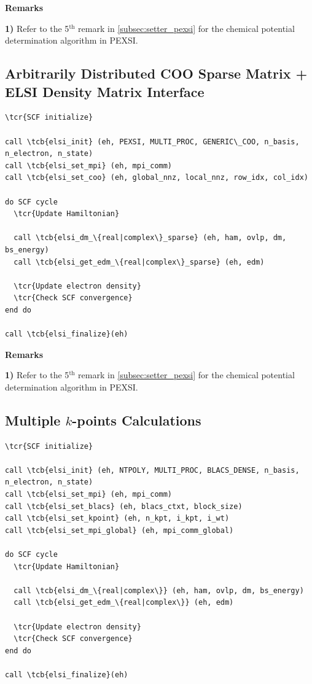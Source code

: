 \documentclass{report}
\newcommand{\tcb}[1]{\textcolor{blue}{#1}}
\newcommand{\tcr}[1]{\textcolor{red}{#1}}
\begin{document}
\textbf{Remarks}

\textbf{1)} Refer to the 5$^\text{th}$ remark in \ref{subsec:setter_pexsi} for the chemical potential determination algorithm in PEXSI.

\subsection*{Arbitrarily Distributed COO Sparse Matrix + ELSI Density Matrix Interface}
\begin{tcolorbox}
\begin{Verbatim}[commandchars=\\\{\}]
\tcr{SCF initialize}

call \tcb{elsi_init} (eh, PEXSI, MULTI_PROC, GENERIC\_COO, n_basis, n_electron, n_state)
call \tcb{elsi_set_mpi} (eh, mpi_comm)
call \tcb{elsi_set_coo} (eh, global_nnz, local_nnz, row_idx, col_idx)

do SCF cycle
  \tcr{Update Hamiltonian}

  call \tcb{elsi_dm_\{real|complex\}_sparse} (eh, ham, ovlp, dm, bs_energy)
  call \tcb{elsi_get_edm_\{real|complex\}_sparse} (eh, edm)

  \tcr{Update electron density}
  \tcr{Check SCF convergence}
end do

call \tcb{elsi_finalize}(eh)
\end{Verbatim}
\end{tcolorbox}

\textbf{Remarks}

\textbf{1)} Refer to the 5$^\text{th}$ remark in \ref{subsec:setter_pexsi} for the chemical potential determination algorithm in PEXSI.

\subsection*{Multiple $k$-points Calculations}
\begin{tcolorbox}
\begin{Verbatim}[commandchars=\\\{\}]
\tcr{SCF initialize}

call \tcb{elsi_init} (eh, NTPOLY, MULTI_PROC, BLACS_DENSE, n_basis, n_electron, n_state)
call \tcb{elsi_set_mpi} (eh, mpi_comm)
call \tcb{elsi_set_blacs} (eh, blacs_ctxt, block_size)
call \tcb{elsi_set_kpoint} (eh, n_kpt, i_kpt, i_wt)
call \tcb{elsi_set_mpi_global} (eh, mpi_comm_global)

do SCF cycle
  \tcr{Update Hamiltonian}

  call \tcb{elsi_dm_\{real|complex\}} (eh, ham, ovlp, dm, bs_energy)
  call \tcb{elsi_get_edm_\{real|complex\}} (eh, edm)

  \tcr{Update electron density}
  \tcr{Check SCF convergence}
end do

call \tcb{elsi_finalize}(eh)
\end{Verbatim}
\end{tcolorbox}
\end{document}
